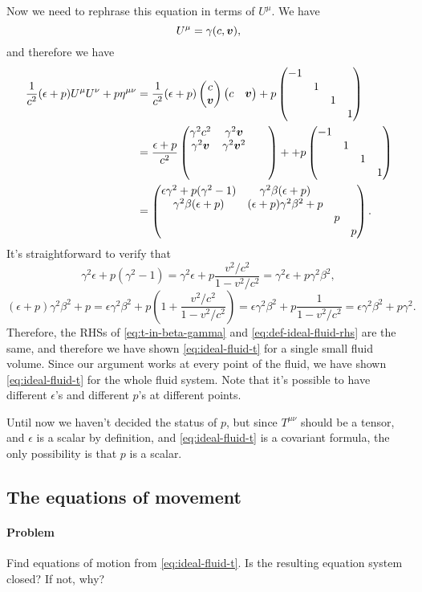 \documentclass[hyperref, a4paper]{article}
\begin{document}
Now we need to rephrase this equation in terms of $U^\mu$. We have 
\begin{equation}
    U^\mu = \gamma (c, \vb*{v}), 
\end{equation}
and therefore we have 
\begin{equation}
    \begin{aligned}
        \frac{1}{c^2} (\epsilon + p) U^\mu U^\nu + p \eta^{\mu \nu} &= \frac{1}{c^2} (\epsilon + p) \pmqty{c \\ \vb*{v}} \pmqty{c & \vb*{v}} + p \pmqty{\dmat{-1, 1, 1, 1}} \\
        &= \frac{\epsilon + p}{c^2} \pmqty{ \dmat{\gamma^2 c^2 & \gamma^2 \vb*{v} \\ \gamma^2 \vb*{v} & \gamma^2 \vb*{v}^2 , , } } + + p \pmqty{\dmat{-1, 1, 1, 1}}  \\
        &= \pmqty{ \dmat{ \epsilon \gamma^2 + p (\gamma^2 - 1) & \gamma^2 \beta (\epsilon + p) \\ \gamma^2 \beta (\epsilon + p) & (\epsilon + p) \gamma^2 \beta^2 + p , p, p } }.
    \end{aligned}
    \label{eq:def-ideal-fluid-rhs}
\end{equation}
It's straightforward to verify that 
\[
    \gamma^2 \epsilon + p(\gamma^2 - 1) = \gamma^2 \epsilon + p \frac{v^2 / c^2}{1 - v^2 / c^2} = \gamma^2 \epsilon + p \gamma^2 \beta^2,
\]
\[
    (\epsilon + p) \gamma^2 \beta^2 + p = \epsilon \gamma^2 \beta^2 + p \left(1 + \frac{v^2/c^2}{1 - v^2 / c^2} \right) = \epsilon \gamma^2 \beta^2 + p \frac{1}{1 - v^2 / c^2} = \epsilon \gamma^2 \beta^2 + p \gamma^2.
\]
Therefore, the RHSs of \eqref{eq:t-in-beta-gamma} and \eqref{eq:def-ideal-fluid-rhs} are the same, and therefore 
we have shown \eqref{eq:ideal-fluid-t} for a single small fluid volume. Since our argument works at every point 
of the fluid, we have shown \eqref{eq:ideal-fluid-t} for the whole fluid system. Note that it's possible to have 
different $\epsilon$'s and different $p$'s at different points.

Until now we haven't decided the status of $p$, but since $T^{\mu \nu}$ should be a tensor, and $\epsilon$ is a 
scalar by definition, and \eqref{eq:ideal-fluid-t} is a covariant formula, the only possibility is that $p$ is a 
scalar. 

\subsection{The equations of movement}

\paragraph{Problem} Find equations of motion from \eqref{eq:ideal-fluid-t}. Is the resulting equation system 
closed? If not, why? 
\end{document}
